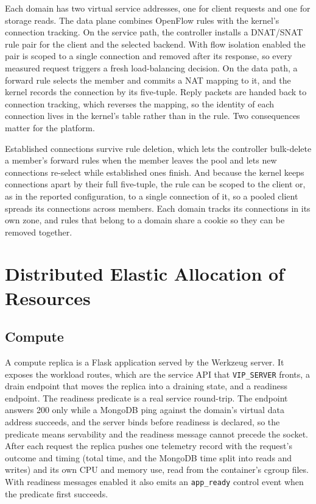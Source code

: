 ﻿\documentclass[12pt,reqno,twoside]{amsbook}
\begin{document}
Each domain has two virtual service addresses, one for client requests
and one for storage reads. The data plane combines OpenFlow rules with
the kernel's connection tracking. On the service path, the controller
installs a DNAT/SNAT rule pair for the client and the selected backend.
With flow isolation enabled the pair is scoped to a single connection and
removed after its response, so every measured request triggers a fresh
load-balancing decision. On the data path, a forward rule selects the member and
commits a NAT mapping to it, and the kernel records the connection by its
five-tuple. Reply packets are handed back to connection tracking, which
reverses the mapping, so the identity of each connection lives in the
kernel's table rather than in the rule. Two consequences matter for the platform.

Established connections survive rule deletion, which lets the controller
bulk-delete a member's forward rules when the member leaves the pool and
lets new connections re-select while established ones finish. And because
the kernel keeps connections apart by their full five-tuple, the rule can
be scoped to the client or, as in the reported configuration, to a single
connection of it, so a pooled client spreads its connections across
members. Each domain tracks its connections in its own zone, and rules
that belong to a domain share a cookie so they can be removed together.

\section{Distributed Elastic Allocation of Resources}\label{sec:impl_elastic}

\subsection{Compute}\label{sec:impl_compute}

A compute replica is a Flask application served by the Werkzeug server.
It exposes the workload routes, which are the service API that
\texttt{VIP\_SERVER} fronts, a drain endpoint that moves the replica into a
draining state, and a readiness endpoint. The readiness predicate is a real
service round-trip. The endpoint answers 200 only while a MongoDB ping against
the domain's virtual data address succeeds, and the server binds before
readiness is declared, so the predicate means servability and the readiness
message cannot precede the socket. After each request the replica pushes one
telemetry record with the request's outcome and timing (total time, and the
MongoDB time split into reads and writes) and its own CPU and memory use, read
from the container's cgroup files. With readiness messages enabled it also
emits an \texttt{app\_ready} control event when the predicate first succeeds.
\end{document}
